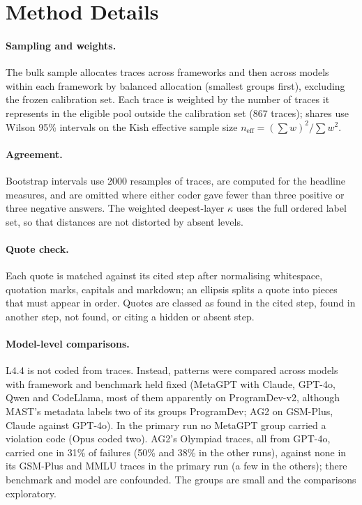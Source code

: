 \documentclass[10pt]{article}
\begin{document}
\section{Method Details}
\label{app:method}

\paragraph{Sampling and weights.} The bulk sample allocates traces across
frameworks and then across models within each framework by balanced allocation
(smallest groups first), excluding the frozen calibration set. Each trace is weighted
by the number of traces it represents in the eligible pool outside the calibration
set (867 traces); shares use Wilson 95\% intervals on the Kish effective sample size
$n_{\mathrm{eff}}=(\sum w)^2/\sum w^2$.

\paragraph{Agreement.} Bootstrap intervals use \num{2000} resamples of traces, are
computed for the headline measures, and are omitted where either coder gave fewer than three positive or three negative
answers. The weighted deepest-layer $\kappa$ uses the full ordered label set, so
that distances are not distorted by absent levels.

\paragraph{Quote check.} Each quote is matched against its cited step after
normalising whitespace, quotation marks, capitals and markdown; an ellipsis splits a
quote into pieces that must appear in order. Quotes are classed as found in the
cited step, found in another step, not found, or citing a hidden or absent step.

\paragraph{Model-level comparisons.} L4.4 is not coded from traces. Instead,
patterns were compared across models with framework and benchmark held fixed
(MetaGPT with Claude, GPT-4o, Qwen and CodeLlama, most of them apparently on
ProgramDev-v2, although MAST's metadata labels two of its groups ProgramDev; AG2
on GSM-Plus, Claude against GPT-4o). In the primary run no MetaGPT group carried a
violation code (Opus coded two). AG2's Olympiad traces, all from GPT-4o, carried
one in 31\% of failures (50\% and 38\% in the other runs), against none in its
GSM-Plus and MMLU traces in the primary run (a few in the others); there benchmark
and model are confounded. The groups are small and the comparisons exploratory.
\end{document}
